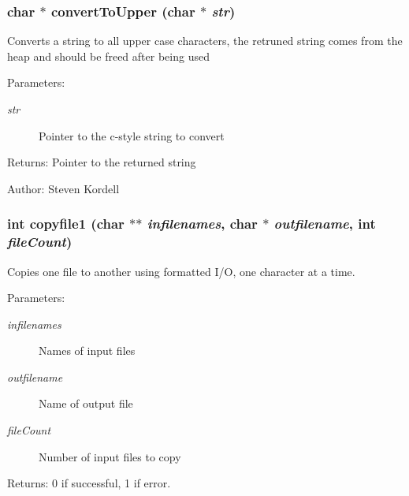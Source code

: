 \subsubsection{\setlength{\rightskip}{0pt plus 5cm}char $\ast$ convert\-To\-Upper (char $\ast$ {\em str})}\label{cptest2_8c_8a3e681cdf4611cfbf894889c80fd0c2}


Converts a string to all upper case characters, the retruned string comes from the heap and should be freed after being used \begin{Desc}
\item[Parameters:]
\begin{description}
\item[{\em str}]Pointer to the c-style string to convert \end{description}
\end{Desc}
\begin{Desc}
\item[Returns:]Pointer to the returned string \end{Desc}
\begin{Desc}
\item[Author:]Steven Kordell \end{Desc}
\subsubsection{\setlength{\rightskip}{0pt plus 5cm}int copyfile1 (char $\ast$$\ast$ {\em infilenames}, char $\ast$ {\em outfilename}, int {\em file\-Count})}\label{cptest2_8c_cc0b5d9f3ceb4a57b059e28cfd816d27}


Copies one file to another using formatted I/O, one character at a time. \begin{Desc}
\item[Parameters:]
\begin{description}
\item[{\em infilenames}]Names of input files \item[{\em outfilename}]Name of output file \item[{\em file\-Count}]Number of input files to copy \end{description}
\end{Desc}
\begin{Desc}
\item[Returns:]0 if successful, 1 if error. \end{Desc}
